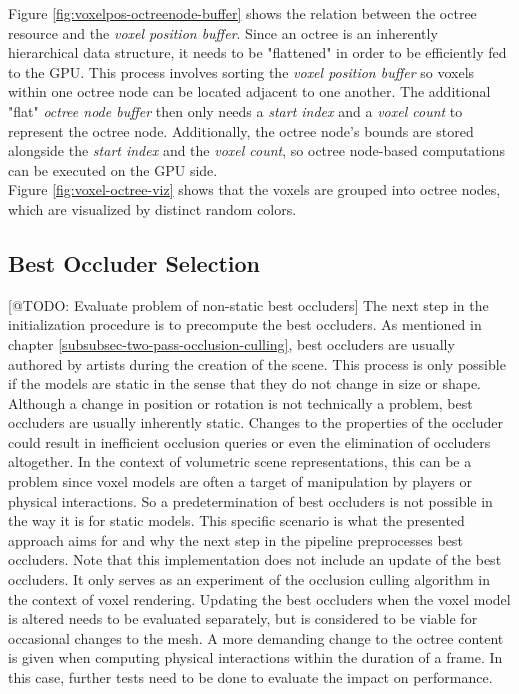 \noindent
Figure \ref{fig:voxelpos-octreenode-buffer} shows the relation between the octree resource and the \emph{voxel position buffer}.
Since an octree is an inherently hierarchical data structure, it needs to be "flattened" in order to be efficiently fed 
to the \ac{GPU}. This process involves sorting the \emph{voxel position buffer} so voxels within one octree node can be 
located adjacent to one another. The additional "flat" \emph{octree node buffer} then only needs a \emph{start index} 
and a \emph{voxel count} to represent the octree node. Additionally, the octree node's bounds are stored alongside the 
\emph{start index} and the \emph{voxel count}, so octree node-based computations can be executed on the \ac{GPU} side. \\

\noindent
Figure \ref{fig:voxel-octree-viz} shows that the voxels are grouped into octree nodes, which are visualized by distinct 
random colors. 


\subsection*{Best Occluder Selection} \label{subsec-best-occluder-selection}

[@TODO: Evaluate problem of non-static best occluders]
The next step in the initialization procedure is to precompute the best occluders. As mentioned in chapter 
\ref{subsubsec-two-pass-occlusion-culling}, best occluders are usually authored by artists during the creation of 
the scene. This process is only possible if the models are static in the sense that they do not change in size or 
shape. Although a change in position or rotation is not technically a problem, best occluders are usually inherently 
static. Changes to the properties of the occluder could result in inefficient occlusion queries or even the elimination 
of occluders altogether. In the context of volumetric scene representations, this can be a problem since voxel models 
are often a target of manipulation by players or physical interactions. So a predetermination of best occluders is not 
possible in the way it is for static models. This specific scenario is what the presented approach aims for and why the 
next step in the pipeline preprocesses best occluders. Note that this implementation does not include an update of 
the best occluders. It only serves as an experiment of the occlusion culling algorithm in the context of voxel rendering. 
Updating the best occluders when the voxel model is altered needs to be evaluated separately, but is considered to be 
viable for occasional changes to the mesh. A more demanding change to the octree content is given when computing physical 
interactions within the duration of a frame. In this case, further tests need to be done to evaluate the impact on 
performance. \\


